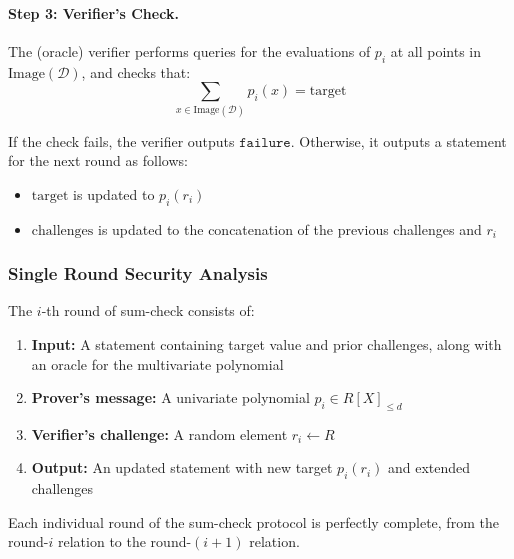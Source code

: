 \paragraph{Step 3: Verifier's Check.} The (oracle) verifier performs queries for the evaluations of $p_i$ at all points in $\text{Image}(\mathcal{D})$, and checks that:
\[
\sum_{x \in \text{Image}(\mathcal{D})} p_i(x) = \text{target}
\]

If the check fails, the verifier outputs $\texttt{failure}$. Otherwise, it outputs a statement for the next round as follows:
\begin{itemize}
    \item $\text{target}$ is updated to $p_i(r_i)$
    \item $\text{challenges}$ is updated to the concatenation of the previous challenges and $r_i$
\end{itemize}

\subsubsection{Single Round Security Analysis}

\begin{definition}
    \label{def:sumcheck_single_round}
    \leanok
    The $i$-th round of sum-check consists of:
    \begin{enumerate}
        \item \textbf{Input:} A statement containing target value and prior challenges, along with an oracle for the multivariate polynomial
        \item \textbf{Prover's message:} A univariate polynomial $p_i \in R[X]_{\leq d}$
        \item \textbf{Verifier's challenge:} A random element $r_i \gets R$
        \item \textbf{Output:} An updated statement with new target $p_i(r_i)$ and extended challenges
    \end{enumerate}
\end{definition}

\begin{theorem}
    \label{thm:sumcheck_single_round_completeness}
    \leanok
    Each individual round of the sum-check protocol is perfectly complete, from the round-$i$ relation to the round-$(i+1)$ relation.
\end{theorem}

